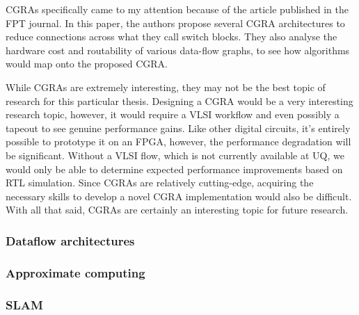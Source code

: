 \documentclass[12pt]{article}
\begin{document}
CGRAs specifically came to my attention because of the article \cite{Boma2022} published in the FPT journal.
In this paper, the authors propose several CGRA architectures to reduce connections across what they call
switch blocks. They also analyse the hardware cost and routability of various data-flow graphs, to see how
algorithms would map onto the proposed CGRA. 

While CGRAs are extremely interesting, they may not be the best topic of research for this particular thesis.
Designing a CGRA would be a very interesting research topic, however, it would require a VLSI workflow and even
possibly a tapeout to see genuine performance gains. Like other digital circuits, it's entirely possible to
prototype it on an FPGA, however, the performance degradation will be significant. Without a VLSI flow, which
is not currently available at UQ, we would only be able to determine expected performance improvements based
on RTL simulation. Since CGRAs are relatively cutting-edge, acquiring the necessary skills to develop a novel
CGRA implementation would also be difficult. With all that said, CGRAs are certainly an interesting topic for
future research.

\subsubsection{Dataflow architectures}

\subsubsection{Approximate computing}

\subsubsection{SLAM}
\end{document}
